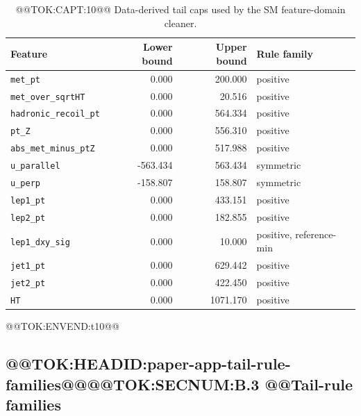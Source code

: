 \documentclass[11pt]{article}
\begin{document}
\begin{table}[h]
\centering
\small
\caption{@@TOK:CAPT:10@@ Data-derived tail caps used by the SM feature-domain cleaner.}
\label{tab:appendix-cleaning-caps}
\begin{tabular}{lrrl}
\toprule
Feature & Lower bound & Upper bound & Rule family \\
\midrule
\texttt{met\_pt} & 0.000 & 200.000 & positive \\
\texttt{met\_over\_sqrtHT} & 0.000 & 20.516 & positive \\
\texttt{hadronic\_recoil\_pt} & 0.000 & 564.334 & positive \\
\texttt{pt\_Z} & 0.000 & 556.310 & positive \\
\texttt{abs\_met\_minus\_ptZ} & 0.000 & 517.988 & positive \\
\texttt{u\_parallel} & -563.434 & 563.434 & symmetric \\
\texttt{u\_perp} & -158.807 & 158.807 & symmetric \\
\texttt{lep1\_pt} & 0.000 & 433.151 & positive \\
\texttt{lep2\_pt} & 0.000 & 182.855 & positive \\
\texttt{lep1\_dxy\_sig} & 0.000 & 10.000 & positive, reference-min \\
\texttt{jet1\_pt} & 0.000 & 629.442 & positive \\
\texttt{jet2\_pt} & 0.000 & 422.450 & positive \\
\texttt{HT} & 0.000 & 1071.170 & positive \\
\bottomrule
\end{tabular}

@@TOK:ENVEND:t10@@\end{table}

\subsection{@@TOK:HEADID:paper-app-tail-rule-families@@@@TOK:SECNUM:B.3 @@Tail-rule families}
\end{document}
